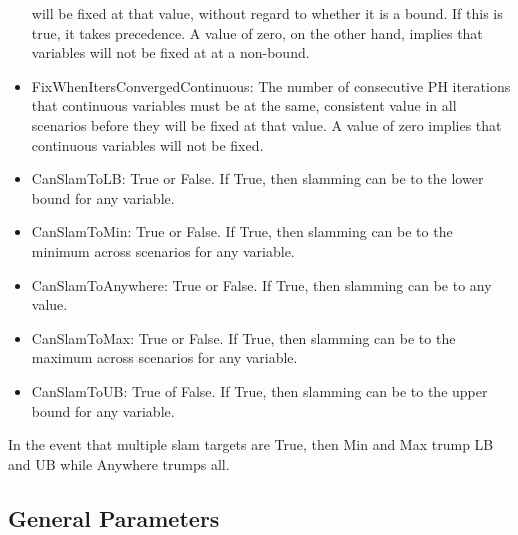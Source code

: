 \begin{itemize}
will be fixed at that value, without regard to whether it is a bound. If this is true, it takes precedence. A value of zero, on the other hand, implies that variables will not be fixed at at a non-bound.
\item FixWhenItersConvergedContinuous: The number of consecutive PH iterations that continuous variables must be at the same, consistent value in all scenarios before they
will be fixed at that value. A value of zero implies that continuous variables will not be fixed.
\item CanSlamToLB: True or False. If True, then slamming can be to the lower bound for any variable.
\item CanSlamToMin: True or False. If True, then slamming can be to the minimum across scenarios for any variable.
\item CanSlamToAnywhere: True or False. If True, then slamming can be to any value.
\item CanSlamToMax: True or False. If True, then slamming can be to the maximum across scenarios for any variable.
\item CanSlamToUB: True of False. If True, then slamming can be to the upper bound for any variable.
\end{itemize}

In the event that multiple slam targets are True, then Min and Max trump LB and UB while Anywhere trumps all.

\subsection{General Parameters}

